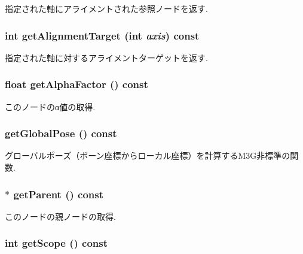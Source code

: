 指定された軸にアライメントされた参照ノードを返す. \hypertarget{classm3g_1_1Node_e5bbf42b3d88193fda0b476e1b1da009}{
\subsubsection[{getAlignmentTarget}]{\setlength{\rightskip}{0pt plus 5cm}int getAlignmentTarget (int {\em axis}) const}}
\label{classm3g_1_1Node_e5bbf42b3d88193fda0b476e1b1da009}


指定された軸に対するアライメントターゲットを返す. \hypertarget{classm3g_1_1Node_bf7e8f9d9f530274aaf27e69910f8689}{
\subsubsection[{getAlphaFactor}]{\setlength{\rightskip}{0pt plus 5cm}float getAlphaFactor () const}}
\label{classm3g_1_1Node_bf7e8f9d9f530274aaf27e69910f8689}


このノードのα値の取得. \hypertarget{classm3g_1_1Node_b50dd3f0331a71cf820bbd1edc894ef0}{
\subsubsection[{getGlobalPose}]{ getGlobalPose () const}}
\label{classm3g_1_1Node_b50dd3f0331a71cf820bbd1edc894ef0}


グローバルポーズ（ボーン座標からローカル座標）を計算するM3G非標準の関数. \hypertarget{classm3g_1_1Node_ce26c2757f265bc6038e6818d2eb6ad9}{
\subsubsection[{getParent}]{ $\ast$ getParent () const}}
\label{classm3g_1_1Node_ce26c2757f265bc6038e6818d2eb6ad9}


このノードの親ノードの取得. \hypertarget{classm3g_1_1Node_a3c291c19cf805338fa4ad3c3deb663a}{
\subsubsection[{getScope}]{\setlength{\rightskip}{0pt plus 5cm}int getScope () const}}
\label{classm3g_1_1Node_a3c291c19cf805338fa4ad3c3deb663a}


